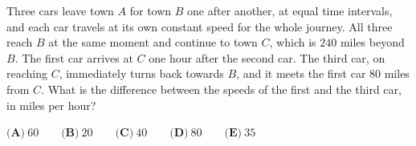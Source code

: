 Three cars leave town $A$ for town $B$ one after another, at equal time intervals, and each car travels at its own constant speed for the whole journey. All three reach $B$ at the same moment and continue to town $C$, which is $240$ miles beyond $B$. The first car arrives at $C$ one hour after the second car. The third car, on reaching $C$, immediately turns back towards $B$, and it meets the first car $80$ miles from $C$. What is the difference between the speeds of the first and the third car, in miles per hour?

$\textbf{(A)}\ 60\qquad\textbf{(B)}\ 20\qquad\textbf{(C)}\ 40\qquad\textbf{(D)}\ 80\qquad\textbf{(E)}\ 35$

